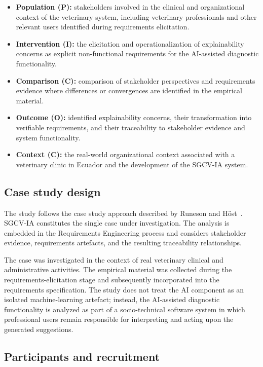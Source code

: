 \documentclass[pdflatex,sn-mathphys-num,Numbered]{sn-jnl}
\begin{document}
\begin{itemize}
\item \textbf{Population (P):} stakeholders involved in the clinical and organizational context of the veterinary system, including veterinary professionals and other relevant users identified during requirements elicitation.
\item \textbf{Intervention (I):} the elicitation and operationalization of explainability concerns as explicit non-functional requirements for the AI-assisted diagnostic functionality.
\item \textbf{Comparison (C):} comparison of stakeholder perspectives and requirements evidence where differences or convergences are identified in the empirical material.
\item \textbf{Outcome (O):} identified explainability concerns, their transformation into verifiable requirements, and their traceability to stakeholder evidence and system functionality.
\item \textbf{Context (C):} the real-world organizational context associated with a veterinary clinic in Ecuador and the development of the SGCV-IA system.
\end{itemize}

\subsection{Case study design}\label{subsec2}

The study follows the case study approach described by Runeson and H\"ost~\cite{runeson2009}. SGCV-IA constitutes the single case under investigation. The analysis is embedded in the Requirements Engineering process and considers stakeholder evidence, requirements artefacts, and the resulting traceability relationships.

The case was investigated in the context of real veterinary clinical and administrative activities. The empirical material was collected during the requirements-elicitation stage and subsequently incorporated into the requirements specification. The study does not treat the AI component as an isolated machine-learning artefact; instead, the AI-assisted diagnostic functionality is analyzed as part of a socio-technical software system in which professional users remain responsible for interpreting and acting upon the generated suggestions.

\subsection{Participants and recruitment}\label{subsec3}
\end{document}
